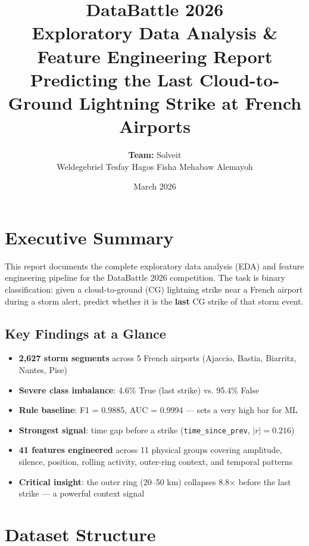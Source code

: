 \documentclass[12pt,a4paper]{article}
\title{
  \vspace{-1cm}
  {\Large \textbf{DataBattle 2026}}\\[0.4em]
  {\large Exploratory Data Analysis \& Feature Engineering Report}\\[0.3em]
  {\normalsize Predicting the Last Cloud-to-Ground Lightning Strike at French Airports}
}
\author{%
  \textbf{Team:} Solveit \\[0.4em]
  Weldegebriel Tesfay Hagos \quad Fisha Mehabaw Alemayoh
}
\date{March 2026}
\begin{document}
\maketitle
\thispagestyle{fancy}

\tableofcontents
\newpage

\section{Executive Summary}

This report documents the complete exploratory data analysis (EDA) and feature engineering
pipeline for the DataBattle 2026 competition. The task is binary classification:
given a cloud-to-ground (CG) lightning strike near a French airport during a storm alert,
predict whether it is the \textbf{last} CG strike of that storm event.

\subsection*{Key Findings at a Glance}

\begin{itemize}[leftmargin=1.5em]
  \item \textbf{2,627 storm segments} across 5 French airports (Ajaccio, Bastia, Biarritz, Nantes, Pise)
  \item \textbf{Severe class imbalance}: 4.6\% True (last strike) vs. 95.4\% False
  \item \textbf{Rule baseline}: F1 = 0.9885, AUC = 0.9994 — sets a very high bar for ML
  \item \textbf{Strongest signal}: time gap before a strike (\texttt{time\_since\_prev}, $|r|=0.216$)
  \item \textbf{41 features engineered} across 11 physical groups covering amplitude, silence,
        position, rolling activity, outer-ring context, and temporal patterns
  \item \textbf{Critical insight}: the outer ring (20--50 km) collapses 8.8$\times$ before the
        last strike — a powerful context signal
\end{itemize}

\section{Dataset Structure}
\end{document}
